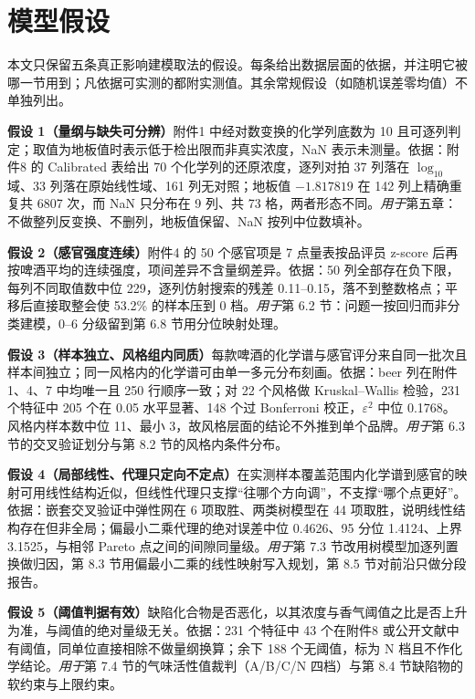 \section{模型假设}

本文只保留五条真正影响建模取法的假设。每条给出数据层面的依据，并注明它被哪一节用到；凡依据可实测的都附实测值。其余常规假设（如随机误差零均值）不单独列出。

\textbf{假设 1（量纲与缺失可分辨）}\quad 附件1 中经对数变换的化学列底数为 10 且可逐列判定；取值为地板值时表示低于检出限而非真实浓度，NaN 表示未测量。依据：附件8 的 Calibrated 表给出 70 个化学列的还原浓度，逐列对拍 37 列落在 $\log_{10}$ 域、33 列落在原始线性域、161 列无对照；地板值 $-1.817819$ 在 142 列上精确重复共 6807 次，而 NaN 只分布在 9 列、共 73 格，两者形态不同。\emph{用于}第五章：不做整列反变换、不删列，地板值保留、NaN 按列中位数填补。

\textbf{假设 2（感官强度连续）}\quad 附件4 的 50 个感官项是 7 点量表按品评员 z-score 后再按啤酒平均的连续强度，项间差异不含量纲差异。依据：50 列全部存在负下限，每列不同取值数中位 229，逐列仿射搜索的残差 0.11--0.15，落不到整数格点；平移后直接取整会使 53.2\% 的样本压到 0 档。\emph{用于}第 6.2 节：问题一按回归而非分类建模，0--6 分级留到第 6.8 节用分位映射处理。

\textbf{假设 3（样本独立、风格组内同质）}\quad 每款啤酒的化学谱与感官评分来自同一批次且样本间独立；同一风格内的化学谱可由单一多元分布刻画。依据：beer 列在附件1、4、7 中均唯一且 250 行顺序一致；对 22 个风格做 Kruskal--Wallis 检验，231 个特征中 205 个在 0.05 水平显著、148 个过 Bonferroni 校正，$\varepsilon^2$ 中位 0.1768。风格内样本数中位 11、最小 3，故风格层面的结论不外推到单个品牌。\emph{用于}第 6.3 节的交叉验证划分与第 8.2 节的风格内条件分布。

\textbf{假设 4（局部线性、代理只定向不定点）}\quad 在实测样本覆盖范围内化学谱到感官的映射可用线性结构近似，但线性代理只支撑“往哪个方向调”，不支撑“哪个点更好”。依据：嵌套交叉验证中弹性网在 6 项取胜、两类树模型在 44 项取胜，说明线性结构存在但非全局；偏最小二乘代理的绝对误差中位 0.4626、95 分位 1.4124、上界 3.1525，与相邻 Pareto 点之间的间隙同量级。\emph{用于}第 7.3 节改用树模型加逐列置换做归因，第 8.3 节用偏最小二乘的线性映射写入规划，第 8.5 节对前沿只做分段报告。

\textbf{假设 5（阈值判据有效）}\quad 缺陷化合物是否恶化，以其浓度与香气阈值之比是否上升为准，与阈值的绝对量级无关。依据：231 个特征中 43 个在附件8 或公开文献中有阈值，同单位直接相除不做量纲换算；余下 188 个无阈值，标为 N 档且不作化学结论。\emph{用于}第 7.4 节的气味活性值裁判（A/B/C/N 四档）与第 8.4 节缺陷物的软约束与上限约束。
